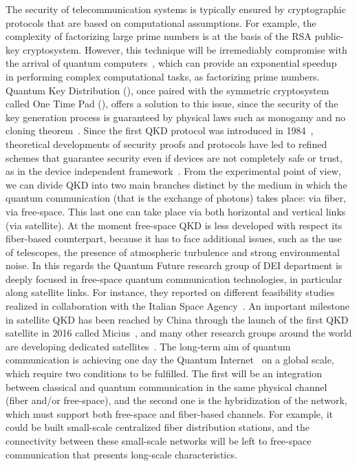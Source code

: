 The security of telecommunication systems is typically ensured by cryptographic protocols that are based on computational assumptions. For example, the complexity of factorizing large prime numbers is at the basis of the RSA public-key cryptosystem. However, this technique will be irremediably compromise with the arrival of quantum computers~\cite{a1,a2,a3}, which can provide an exponential speedup~\cite{a4} in performing complex computational tasks, as factorizing prime numbers. Quantum Key Distribution (), once paired with the symmetric cryptosystem called One Time Pad (), offers a solution to this issue, since the security of the key generation process is guaranteed by physical laws such as monogamy and no cloning theorem~\cite{a5}.
Since the first QKD protocol was introduced in 1984~\cite{a6}, theoretical developments of security proofs and protocols have led to refined schemes that guarantee security even if devices are not completely safe or trust, as in the device independent framework~\cite{a5,a6,a7,a8,a9,a10,a11}.
From the experimental point of view, we can divide QKD into two main branches distinct by the medium in which the quantum communication (that is the exchange of photons) takes place: via fiber, via free-space. This last one can take place via both horizontal and vertical links (via satellite). At the moment free-space QKD is less developed with respect its fiber-based counterpart, because it has to face additional issues, such as the use of telescopes, the presence of atmospheric turbulence and strong environmental noise. In this regards the Quantum Future research group of DEI department is deeply focused in free-space quantum communication technologies, in particular along satellite links. For instance, they reported on different feasibility studies realized in collaboration with the Italian Space Agency~\cite{a12,a13,a14}. An important milestone in satellite QKD has been reached by China through the launch of the first QKD satellite in 2016 called Micius~\cite{a15}, and many other research groups around the world are developing dedicated satellites~\cite{a16,a17,a18}. The long-term aim of quantum communication is achieving one day the Quantum Internet~\cite{a19} on a global scale, which require two conditions to be fulfilled. The first will be an integration between classical and quantum communication in the same physical channel (fiber and/or free-space), and the second one is the hybridization of the network, which must support both free-space and fiber-based channels. For example, it could be built small-scale centralized fiber distribution stations, and the connectivity between these small-scale networks will be left to free-space communication that presents long-scale characteristics.


